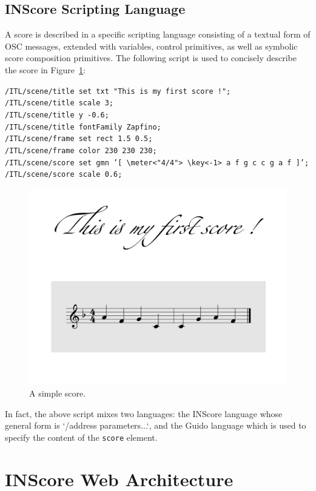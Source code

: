 \documentclass{article}
\newcommand{\icode}[1]	{{\small \texttt{#1}}}
\newcommand{\code}[1]	{\vspace{-1em}\begin{center}\colorbox{mygrey}{\begin{minipage}[t]{0.98\columnwidth} {\scriptsize \texttt{#1}}\end{minipage}}\end{center}}
\begin{document}
\subsection{INScore Scripting Language}
A score is described in a specific scripting language consisting of a textual form of OSC messages, extended with variables, control primitives, as well as symbolic score composition primitives. The following script is used to concisely describe the score in Figure~\ref{fig:score}:
\code{/ITL/scene/title set txt "This is my first score !"; \\
/ITL/scene/title scale 3;\\
/ITL/scene/title y -0.6;\\
/ITL/scene/title fontFamily Zapfino;\\
/ITL/scene/frame set rect 1.5 0.5;\\
/ITL/scene/frame color 230 230 230;\\
/ITL/scene/score set gmn 
   '[ \textbackslash meter<"4/4"> \textbackslash key<-1> a f g c c g a f ]';\\
/ITL/scene/score scale 0.6;}

\begin{figure}[h]
\centering
\includegraphics[width=0.7\columnwidth]{rsrc/inscore-exemple.png}
\caption{A simple score.}
\label{fig:score}
\end{figure}
In fact, the above script mixes two languages: the INScore language whose general form is `/address parameters...`, and the Guido language \cite{hoos98} which is used to specify the content of the \icode{score} element.

\section{INScore Web Architecture}\label{sec:arch}
\end{document}
